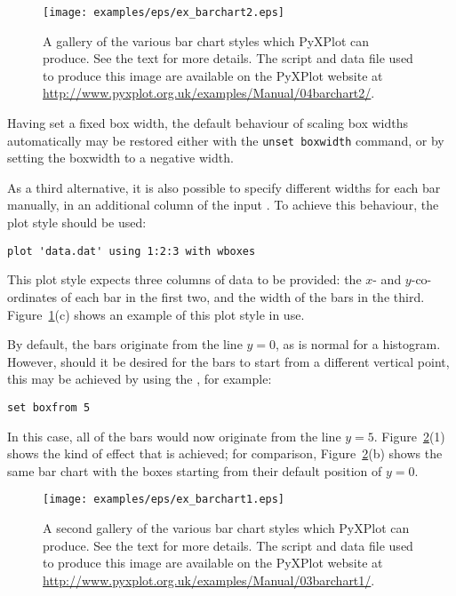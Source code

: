 \begin{figure}
\begin{center}
\texttt{[image: examples/eps/ex\_barchart2.eps]}
\end{center}
\caption[A gallery of the various bar chart styles which PyXPlot can produce]
{A gallery of the various bar chart styles which PyXPlot can produce.
See the text for more details.  The script and data file used to produce this
image are available on the PyXPlot website at
\protect\url{http://www.pyxplot.org.uk/examples/Manual/04barchart2/}.}
\label{fig:ex_barchart2}
\end{figure}

Having set a fixed box width, the default behaviour of scaling box widths
automatically may be restored either with the {\tt unset boxwidth} command,
or by setting the boxwidth to a negative width.

As a third alternative, it is also possible to specify different widths for
each bar manually, in an additional column of the input \datafile. To achieve
this behaviour, the  plot style should be used:

\begin{verbatim} 
plot 'data.dat' using 1:2:3 with wboxes
\end{verbatim}

\noindent This plot style expects three columns of data to be provided: the
$x$- and $y$-co-ordinates of each bar in the first two, and the width of the
bars in the third.  Figure~\ref{fig:ex_barchart2}(c) shows an example of this
plot style in use.

By default, the bars originate from the line $y=0$, as is normal for a
histogram. However, should it be desired for the bars to start from a different
vertical point, this may be achieved by using the ,
for example:

\begin{verbatim} 
set boxfrom 5
\end{verbatim}

\noindent In this case, all of the bars would now originate from the line
$y=5$. Figure~\ref{fig:ex_barchart1}(1) shows the kind of effect that is
achieved; for comparison, Figure~\ref{fig:ex_barchart1}(b) shows the same bar
chart with the boxes starting from their default position of $y=0$.

\begin{figure}
\begin{center}
\texttt{[image: examples/eps/ex\_barchart1.eps]}
\end{center}
\caption[A second gallery of the various bar chart styles which PyXPlot can
produce]
{A second gallery of the various bar chart styles which PyXPlot can
produce. See the text for more details.  The script and data file used to
produce this image are available on the PyXPlot website at
\protect\url{http://www.pyxplot.org.uk/examples/Manual/03barchart1/}.}
\label{fig:ex_barchart1}
\end{figure}

